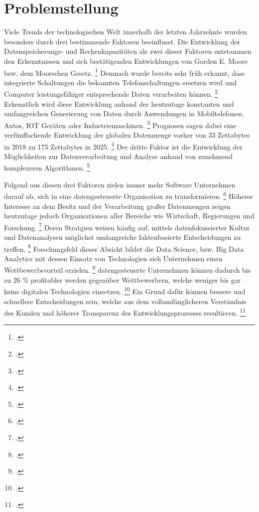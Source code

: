 \chapter[Problemstellung]{Problemstellung}

Viele Trends der technologischen Welt innerhalb der letzten Jahrzehnte wurden besonders durch drei bestimmende Faktoren beeinflusst.
Die Entwicklung der Datenspeicherungs- und Rechenkapazitäten als zwei dieser Faktoren entstammen den Erkenntnissen und sich bestätigenden Entwicklungen von Gorden E. Moore bzw. dem Moorschen Gesetz. \footcite[Vgl.][S. 1]{Moore.1998}
Demnach wurde bereits sehr früh erkannt, dass integrierte Schaltungen die bekannten Telefonschaltungen ersetzen wird und Computer leistungsfähiger entsprechende Daten verarbeiten können. \footcite[Vgl.][S. 1]{Moore.1998}
Erkenntlich wird diese Entwicklung anhand der heutzutage konstanten und umfangreichen Generierung von Daten durch Anwendungen in Mobiltelefonen, Autos, IOT Geräten oder Industriemaschinen. \footcite[Vgl.][S 3f.]{Dalpiaz.2020}
Prognosen sagen dabei eine verfünffachende Entwicklung der globalen Datenmenge vorher von 33 Zettabytes in 2018 zu 175 Zettabytes in 2025. \footcite[prenote][postnote]{Increase from global data 2018}
Der dritte Faktor ist die Entwicklung der Möglichkeiten zur Datenverarbeitung und Analyse anhand von zunehmend komplexeren Algorithmen. \footcite[Vgl.][S. 4]{Dalpiaz.2020}

Folgend aus diesen drei Faktoren zielen immer mehr Software Unternehmen darauf ab, sich in eine datengesteuerte Organisation zu transformieren. \footcite[Vgl.][S. 1]{Fabijan.2017}
Höheres Interesse an dem Besitz und der Verarbeitung großer Datenmengen zeigen heutzutage jedoch Organisationen aller Bereiche wie Wirtschaft, Regierungen und Forschung. \footcite[Vgl.][S. 1]{Pratt.2023}
Deren Stratgien weisen häufig auf, mittels datenfokussierter Kultur und Datenanalysen möglichst umfangreiche faktenbasierte Entscheidungen zu treffen. \footcite[Vgl.][S. 18]{Dalpiaz.2020}
Forschungsfeld dieser Absicht bildet die Data Science, bzw. Big Data Analytics mit dessen Einsatz von Technologien sich Unternehmen einen Wettbewerbsvorteil erzielen. \footcite[Vgl.][S. 3]{Dalpiaz.2020}
datengesteuerte Unternehmen können dadurch bis zu 26 \% profitabler werden gegenüber Wettbewerbern, welche weniger bis gar keine digitalen Technologien einsetzen. \footcite[Vgl.][S. 1]{Fabijan.2017}
Ein Grund dafür können bessere und schnellere Entscheidungen sein, welche aus dem vollumfänglicheren Verständnis des Kunden und höherer Transparenz des Entwicklungsprozesses resultieren. \footcite[Vgl.][S. 18]{Dalpiaz.2020}

